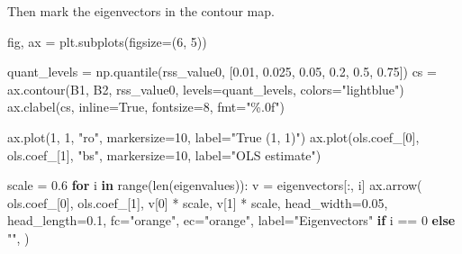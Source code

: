 \documentclass[
  letterpaper,
  DIV=11,
  numbers=noendperiod]{scrreprt}
\newenvironment{Shaded}{\begin{snugshade}}{\end{snugshade}}
\newcommand{\BuiltInTok}[1]{\textcolor[rgb]{0.00,0.23,0.31}{#1}}
\newcommand{\ControlFlowTok}[1]{\textcolor[rgb]{0.00,0.23,0.31}{\textbf{#1}}}
\newcommand{\DecValTok}[1]{\textcolor[rgb]{0.68,0.00,0.00}{#1}}
\newcommand{\FloatTok}[1]{\textcolor[rgb]{0.68,0.00,0.00}{#1}}
\newcommand{\KeywordTok}[1]{\textcolor[rgb]{0.00,0.23,0.31}{\textbf{#1}}}
\newcommand{\NormalTok}[1]{\textcolor[rgb]{0.00,0.23,0.31}{#1}}
\newcommand{\OperatorTok}[1]{\textcolor[rgb]{0.37,0.37,0.37}{#1}}
\newcommand{\StringTok}[1]{\textcolor[rgb]{0.13,0.47,0.30}{#1}}
\newcommand{\VariableTok}[1]{\textcolor[rgb]{0.07,0.07,0.07}{#1}}
\theoremstyle{definition}
\theoremstyle{definition}
\theoremstyle{plain}
\theoremstyle{plain}
\theoremstyle{remark}
\begin{document}
\begin{tcolorbox}
Then mark the eigenvectors in the contour map.

\begin{Shaded}
\begin{Highlighting}[]
\NormalTok{fig, ax }\OperatorTok{=}\NormalTok{ plt.subplots(figsize}\OperatorTok{=}\NormalTok{(}\DecValTok{6}\NormalTok{, }\DecValTok{5}\NormalTok{))}

\NormalTok{quant\_levels }\OperatorTok{=}\NormalTok{ np.quantile(rss\_value0, [}\FloatTok{0.01}\NormalTok{, }\FloatTok{0.025}\NormalTok{, }\FloatTok{0.05}\NormalTok{, }\FloatTok{0.2}\NormalTok{, }\FloatTok{0.5}\NormalTok{, }\FloatTok{0.75}\NormalTok{])}
\NormalTok{cs }\OperatorTok{=}\NormalTok{ ax.contour(B1, B2, rss\_value0, levels}\OperatorTok{=}\NormalTok{quant\_levels, colors}\OperatorTok{=}\StringTok{"lightblue"}\NormalTok{)}
\NormalTok{ax.clabel(cs, inline}\OperatorTok{=}\VariableTok{True}\NormalTok{, fontsize}\OperatorTok{=}\DecValTok{8}\NormalTok{, fmt}\OperatorTok{=}\StringTok{"\%.0f"}\NormalTok{)}

\NormalTok{ax.plot(}\DecValTok{1}\NormalTok{, }\DecValTok{1}\NormalTok{, }\StringTok{"ro"}\NormalTok{, markersize}\OperatorTok{=}\DecValTok{10}\NormalTok{, label}\OperatorTok{=}\StringTok{"True (1, 1)"}\NormalTok{)}
\NormalTok{ax.plot(ols.coef\_[}\DecValTok{0}\NormalTok{], ols.coef\_[}\DecValTok{1}\NormalTok{], }\StringTok{"bs"}\NormalTok{, markersize}\OperatorTok{=}\DecValTok{10}\NormalTok{, label}\OperatorTok{=}\StringTok{"OLS estimate"}\NormalTok{)}

\NormalTok{scale }\OperatorTok{=} \FloatTok{0.6}
\ControlFlowTok{for}\NormalTok{ i }\KeywordTok{in} \BuiltInTok{range}\NormalTok{(}\BuiltInTok{len}\NormalTok{(eigenvalues)):}
\NormalTok{    v }\OperatorTok{=}\NormalTok{ eigenvectors[:, i]}
\NormalTok{    ax.arrow(}
\NormalTok{        ols.coef\_[}\DecValTok{0}\NormalTok{],}
\NormalTok{        ols.coef\_[}\DecValTok{1}\NormalTok{],}
\NormalTok{        v[}\DecValTok{0}\NormalTok{] }\OperatorTok{*}\NormalTok{ scale,}
\NormalTok{        v[}\DecValTok{1}\NormalTok{] }\OperatorTok{*}\NormalTok{ scale,}
\NormalTok{        head\_width}\OperatorTok{=}\FloatTok{0.05}\NormalTok{,}
\NormalTok{        head\_length}\OperatorTok{=}\FloatTok{0.1}\NormalTok{,}
\NormalTok{        fc}\OperatorTok{=}\StringTok{"orange"}\NormalTok{,}
\NormalTok{        ec}\OperatorTok{=}\StringTok{"orange"}\NormalTok{,}
\NormalTok{        label}\OperatorTok{=}\StringTok{"Eigenvectors"} \ControlFlowTok{if}\NormalTok{ i }\OperatorTok{==} \DecValTok{0} \ControlFlowTok{else} \StringTok{""}\NormalTok{,}
\NormalTok{    )}


\end{Highlighting}
\end{Shaded}
\end{tcolorbox}
\end{document}
